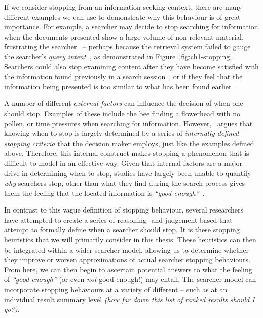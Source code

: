 If we consider stopping from an information seeking context, there are many different examples we can use to demonstrate why this behaviour is of great importance. For example, a searcher may decide to stop searching for information when the documents presented show a large volume of non-relevant material, frustrating the searcher~\citep{cooper1973retrieval_effectiveness_ii} -- perhaps because the retrieval system failed to gauge the searcher's \emph{query intent}~\citep{ashkan2009classifying}, as demonstrated in Figure~\ref{fig:ch1-stopping}. Searchers could also stop examining content after they have become satisfied with the information found previously in a search session~\citep{cooper1973retrieval_effectiveness, gibb1958number_rule, simon1955satiation}, or if they feel that the information being presented is too similar to what has been found earlier~\citep{nickles1995judgment}.

A number of different \emph{external factors} can influence the decision of when one should stop. Examples of these include the bee finding a flowerhead with no pollen, or time pressures when searching for information. However,~\cite{nickles1995judgment} argues that knowing when to stop is largely determined by a series of \emph{internally defined stopping criteria} that the decision maker employs, just like the examples defined above. Therefore, this internal construct makes stopping a phenomenon that is difficult to model in an effective way. Given that internal factors are a major drive in determining when to stop, studies have largely been unable to quantify \emph{why} searchers stop, other than what they find during the search process gives them the feeling that the located information is \emph{``good enough''}~\citep{zach2005enough_is_enough}.

In contrast to this vague definition of stopping behaviour, several researchers have attempted to create a series of reasoning- and judgement-based  that attempt to formally define when a searcher should stop. It is these stopping heuristics that we will primarily consider in this thesis. These heuristics can then be integrated within a wider searcher model, allowing us to determine whether they improve or worsen approximations of actual searcher stopping behaviours. From here, we can then begin to ascertain potential answers to what the feeling of \emph{``good enough''} (or even \emph{not} good enough!) may entail. The searcher model can incorporate stopping behaviours at a variety of different  -- such as at an individual result summary level \emph{(how far down this list of ranked results should I go?)}.


